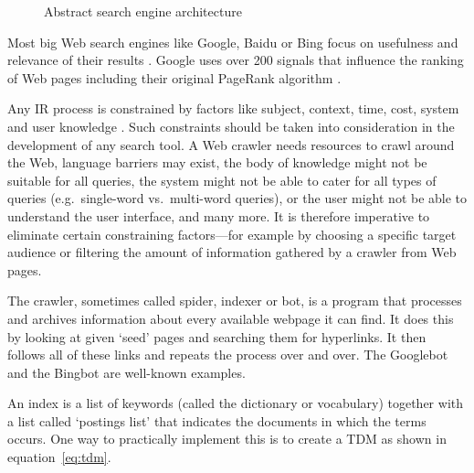 \begin{figure}[!htbp]
  \centering
\caption[Search engine architecture]{Abstract search engine architecture}
\label{fig:sea}
\end{figure}

Most big Web search engines like Google, Baidu or Bing focus on usefulness and relevance of their results \autocite{Google2012, Baidu2012, Microsoft2012a}. Google uses over \num{200} signals \autocite*{Google2012} that influence the ranking of Web pages including their original PageRank algorithm \autocite{Brin1998, Brin1998b}.

Any \ac{IR} process is constrained by factors like subject, context, time, cost, system and user knowledge \autocite{Marchionini1988}. Such constraints should be taken into consideration in the development of any search tool. A Web crawler needs resources to crawl around the Web, language barriers may exist, the body of knowledge might not be suitable for all queries, the system might not be able to cater for all types of queries (e.g.\ single-word vs.\ multi-word queries), or the user might not be able to understand the user interface, and many more. It is therefore imperative to eliminate certain constraining factors---for example by choosing a specific target audience or filtering the amount of information gathered by a crawler from Web pages.

The crawler, sometimes called spider, indexer or bot, is a program that processes and archives information about every available webpage it can find. It does this by looking at given `seed' pages and searching them for hyperlinks. It then follows all of these links and repeats the process over and over. The Googlebot \autocite*{Google2016} and the Bingbot \autocite*{Bing2016} are well-known examples.

An index is a list of keywords (called the dictionary or vocabulary) together with a list called `postings list' that indicates the documents in which the terms occurs. One way to practically implement this is to create a \ac{TDM} as shown in equation~\ref{eq:tdm}\sidepar{$\bm{\Sigma}$~\ref{eq:tdm}}.


